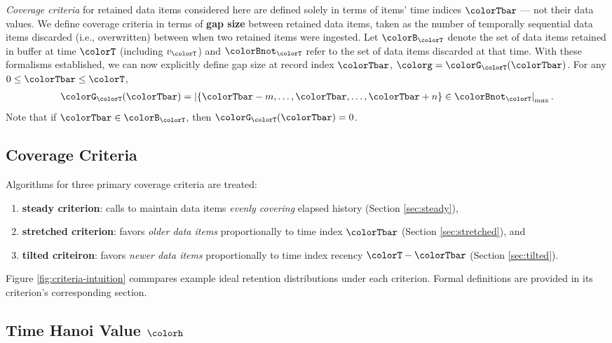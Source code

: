 \textit{Coverage criteria} for retained data items considered here are defined solely in terms of items' time indices $\colorTbar$ --- not their data values.
We define coverage criteria in terms of \textbf{gap size} between retained data items, taken as the number of temporally sequential data items discarded (i.e., overwritten) between when two retained items were ingested.
Let $\colorB_{\colorT}$ denote the set of data items retained in buffer at time $\colorT$ (including $v_{\colorT}$) and $\colorBnot_{\colorT}$ refer to the set of data items discarded at that time.
With these formalisms established, we can now explicitly define gap size at record index $\colorTbar$, $\colorg = \colorG_{\colorT}(\colorTbar)$.
For any $0 \leq \colorTbar \leq \colorT$,
\begin{align*}
\colorG_{\colorT}(\colorTbar) = \left| \{\colorTbar - m, \ldots, \colorTbar, \ldots, \colorTbar+n\} \in \colorBnot_{\colorT} \right|_\mathrm{max}.
\end{align*}
Note that if $\colorTbar \in \colorB_{\colorT}$, then $\colorG_{\colorT}(\colorTbar) = 0$.

\subsection{Coverage Criteria}

Algorithms for three primary coverage criteria are treated:
\begin{enumerate}
\item \textbf{steady criterion}: calls to maintain data items \textit{evenly covering} elapsed history (Section \ref{sec:steady}),
\item \textbf{stretched criterion}: favors \textit{older data items} proportionally to time index $\colorTbar$ (Section \ref{sec:stretched}), and
\item \textbf{tilted criteiron}: favors \textit{newer data items} proportionally to time index recency $\colorT - \colorTbar$ (Section \ref{sec:tilted}).
\end{enumerate}
Figure \ref{fig:criteria-intuition} commpares example ideal retention distributions under each criterion.
Formal definitions are provided in its criterion's corresponding section.

\subsection{Time Hanoi Value $\colorh$}



